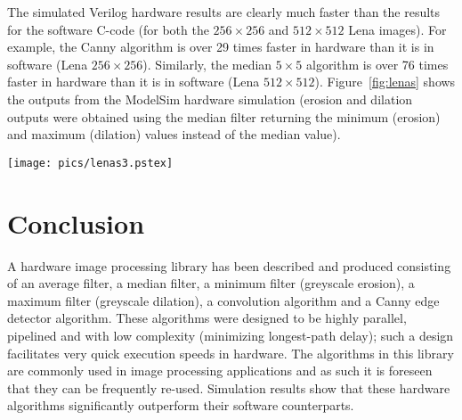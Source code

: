 \documentclass[10pt,twocolumn,letterpaper]{article}
\begin{document}
The simulated Verilog hardware results are clearly much faster than the results for the software C-code (for both the $256\times256$ and 
$512\times512$ Lena images). 
For example, the Canny algorithm is over 29 times faster in hardware 
than it is in software (Lena $256\times256$).
Similarly, the median $5\times5$ algorithm is over 76 times faster in 
hardware than it is in software (Lena $512\times512$).
Figure~\ref{fig:lenas} shows the outputs from the ModelSim hardware simulation (erosion and dilation outputs were
obtained using the median filter returning the minimum (erosion) and maximum (dilation) values instead of the median value).
\begin{figure*}[!htb]
\begin{center}
\setlength{\abovecaptionskip}{-0.25cm}
        \texttt{[image: pics/lenas3.pstex]}
        \caption{Images processed in ModelSim using Verilog: 
	{\bf (a)} original Lena $256\times256$, {\bf (b)} Lena with salt and pepper noise, {\bf (c)} median $3\times3$ filter applied to Lena with
	salt and pepper noise,
	{\bf (d)} average $3\times3$ filter applied to Lena with salt and pepper noise, 
	{\bf (e)} Gaussian $3\times3$ smoothing (convolution) applied to original Lena,
	{\bf (f)} Canny algorithm applied to original Lena, {\bf (g)} Greyscale erosion (minimum) $3\times3$ applied to original Lena, 
	{\bf (h)} Greyscale dilation (maximum) $3\times3$ applied to original Lena}
        \label{fig:lenas}
\setlength{\abovecaptionskip}{0cm}
\end{center}
\end{figure*}

\section{Conclusion}
A hardware image processing library has been described and produced consisting of an average filter, a median filter, a
minimum filter (greyscale erosion), a maximum filter (greyscale dilation), a convolution algorithm and a Canny
edge detector algorithm. 
These algorithms were designed to be highly parallel, pipelined and with low complexity (minimizing longest-path delay);
such a design facilitates very quick execution speeds in hardware.
The algorithms in this library 
are commonly used in image processing applications and as such
it is foreseen that they can be frequently re-used.
Simulation results show that these hardware algorithms significantly outperform their software
counterparts.
\end{document}
